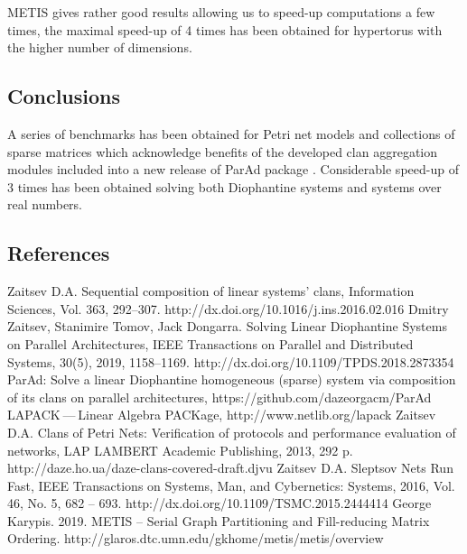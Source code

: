 \documentclass[10pt, a5paper]{article}
\begin{document}
METIS \cite{bib7} gives rather good results allowing us to speed-up \linebreak computations a few times, the maximal speed-up of 4 times has been obtained for hypertorus with the higher number of dimensions.

\subsection*{Conclusions}

A series of benchmarks has been obtained for Petri net models and collections of sparse matrices which acknowledge benefits of the developed clan aggregation modules included into a new release of ParAd package \cite{bib3}. Considerable speed-up of 3 times has been obtained solving both Diophantine systems and systems over real numbers.

\subsection*{References}

\begin{thebibliography}{9}
 {Zaitsev D.A. Sequential composition of linear systems’ clans, Information Sciences, Vol. 363, 292–307. http://dx.doi.org/10.1016/j.ins.2016.02.016}
 {Dmitry Zaitsev, Stanimire Tomov, Jack Dongarra. Solving Linear Diophantine Systems on Parallel Architectures, IEEE Transactions on Parallel and Distributed Systems, 30(5), 2019, 1158–1169. http://dx.doi.org/10.1109/TPDS.2018.2873354}
 {ParAd: Solve a linear Diophantine homogeneous (sparse) system via composition of its clans on parallel architectures, https://github.com/dazeorgacm/ParAd}
 {LAPACK — Linear Algebra PACKage, http://www.netlib.org/lapack}
 {Zaitsev D.A. Clans of Petri Nets: Verification of protocols and performance evaluation of networks, LAP LAMBERT Academic Publishing, 2013, 292 p. http://daze.ho.ua/daze-clans-covered-draft.djvu}
 {Zaitsev D.A. Sleptsov Nets Run Fast, IEEE Transactions on Systems, Man, and Cybernetics: Systems, 2016, Vol. 46, No. 5, 682 -- 693. http://dx.doi.org/10.1109/TSMC.2015.2444414}
 {George Karypis. 2019. METIS -- Serial Graph Partitioning and Fill-reducing Matrix Ordering. http://glaros.dtc.umn.edu/gkhome/metis/metis/overview}\end{thebibliography}
\end{document}
